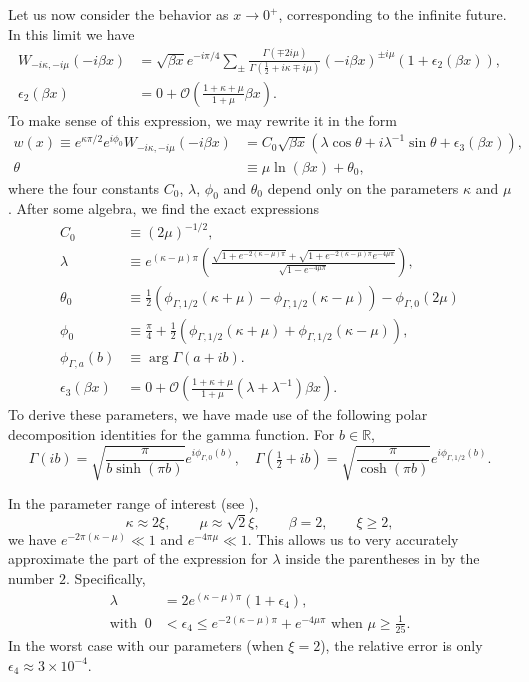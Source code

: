 Let us now consider the behavior as $x\to0^{+}$, corresponding to the infinite future. In this limit we have 
\begin{align*}
W_{-i\kappa,-i\mu}(-i\beta x) & =\sqrt{\beta x}e^{-i\pi/4}\sum_{\pm}\frac{\Gamma\left(\mp2i\mu\right)}{\Gamma\left(\tfrac{1}{2}+i\kappa\mp i\mu\right)}(-i\beta x)^{\pm i\mu}\left(1+\epsilon_{2}(\beta x)\right),\\
\epsilon_{2}(\beta x) & =0+\mathcal{O}\left(\frac{1+\kappa+\mu}{1+\mu}\beta x\right).
\end{align*}
 To make sense of this expression, we may rewrite it in the form 
\begin{align}
w(x)\equiv e^{\kappa\pi/2}e^{i\phi_{0}}W_{-i\kappa,-i\mu}(-i\beta x) & =C_{0}\sqrt{\beta x}\left(\lambda\cos\theta+i\lambda^{-1}\sin\theta+\epsilon_{3}(\beta x)\right),\label{eq:w-exact}\\
\theta & \equiv\mu\ln(\beta x)+\theta_{0},
\end{align}
 where the four constants $C_{0}$, $\lambda$, $\phi_{0}$ and $\theta_{0}$ depend only on the parameters $\kappa$ and $\mu$. After some algebra, we find the exact expressions
\begin{align}
C_{0} & \equiv(2\mu)^{-1/2},\label{eq:whit-consts}\\
\lambda & \equiv e^{(\kappa-\mu)\pi}\left(\frac{\sqrt{1+e^{-2(\kappa-\mu)\pi}}+\sqrt{1+e^{-2(\kappa-\mu)\pi}e^{-4\mu\pi}}}{\sqrt{1-e^{-4\mu\pi}}}\right),\label{eq:whit-lambda}\\
\theta_{0} & \equiv\tfrac{1}{2}\left(\phi_{\Gamma,1/2}(\kappa+\mu)-\phi_{\Gamma,1/2}(\kappa-\mu)\right)-\phi_{\Gamma,0}(2\mu)\\
\phi_{0} & \equiv\tfrac{\pi}{4}+\tfrac{1}{2}\left(\phi_{\Gamma,1/2}(\kappa+\mu)+\phi_{\Gamma,1/2}(\kappa-\mu)\right),\label{eq:phi-0}\\
\phi_{\Gamma,a}(b) & \equiv\arg\Gamma(a+ib).\\
\epsilon_{3}(\beta x) & =0+\mathcal{O}\left(\frac{1+\kappa+\mu}{1+\mu}(\lambda+\lambda^{-1})\beta x\right).
\end{align}
 To derive these parameters, we have made use of the following polar decomposition identities for the gamma function. For $b\in\mathbb{R}$, 
\[
\Gamma\left(ib\right)=\sqrt{\frac{\pi}{b\sinh(\pi b)}}e^{i\phi_{\Gamma,0}(b)},\quad\Gamma\left(\tfrac{1}{2}+ib\right)=\sqrt{\frac{\pi}{\cosh(\pi b)}}e^{i\phi_{\Gamma,1/2}(b)}.
\]

In the parameter range of interest (see ), 
\[
\kappa\approx2\xi,\qquad\mu\approx\sqrt{2}\xi,\qquad\beta=2,\qquad\xi\geq2,
\]
 we have $e^{-2\pi(\kappa-\mu)}\ll1$ and $e^{-4\pi\mu}\ll1$. This allows us to very accurately approximate the part of the expression for $\lambda$ inside the parentheses in  by the number $2$. Specifically, 
\begin{align}
\lambda & =2e^{(\kappa-\mu)\pi}\left(1+\epsilon_{4}\right),\label{eq:l-approx}\\
\textrm{with }\ 0 & <\epsilon_{4}\leq e^{-2(\kappa-\mu)\pi}+e^{-4\mu\pi}\textrm{ when }\mu\geq\tfrac{1}{25}.
\end{align}
 In the worst case with our parameters (when $\xi=2$), the relative error is only $\epsilon_{4}\approx3\times10^{-4}$. 

